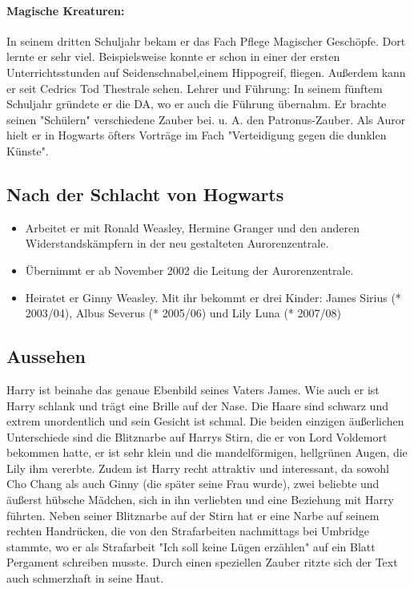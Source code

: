 \documentclass[a4paper, 10pt]{article}
\begin{document}
\paragraph{Magische Kreaturen:}
In seinem dritten Schuljahr bekam er das Fach Pflege Magischer Geschöpfe. Dort lernte er sehr viel. Beispielsweise konnte er schon in einer der ersten Unterrichtsstunden auf Seidenschnabel,einem Hippogreif, fliegen. Außerdem kann er seit Cedrics Tod Thestrale sehen.
Lehrer und Führung: In seinem fünftem Schuljahr gründete er die DA, wo er auch die Führung übernahm. Er brachte seinen "Schülern" verschiedene Zauber bei. u. A. den Patronus-Zauber. Als Auror hielt er in Hogwarts öfters Vorträge im Fach "Verteidigung gegen die dunklen Künste".
\subsection*{Nach der Schlacht von Hogwarts}
\begin{itemize}
\item Arbeitet er mit Ronald Weasley, Hermine Granger und den anderen Widerstandskämpfern in der neu gestalteten Aurorenzentrale.
\item Übernimmt er ab November 2002 die Leitung der Aurorenzentrale.
\item Heiratet er Ginny Weasley. Mit ihr bekommt er drei Kinder: James Sirius (* 2003/04), Albus Severus (* 2005/06) und Lily Luna (* 2007/08)
\end{itemize}
\subsection*{\Large Aussehen}
Harry ist beinahe das genaue Ebenbild seines Vaters James. Wie auch er ist Harry schlank und trägt eine Brille auf der Nase. Die Haare sind schwarz und extrem unordentlich und sein Gesicht ist schmal. Die beiden einzigen äußerlichen Unterschiede sind die Blitznarbe auf Harrys Stirn, die er von Lord Voldemort bekommen hatte, er ist sehr klein und die mandelförmigen, hellgrünen Augen, die Lily ihm vererbte. Zudem ist Harry recht attraktiv und interessant, da sowohl Cho Chang als auch Ginny (die später seine Frau wurde), zwei beliebte und äußerst hübsche Mädchen, sich in ihn verliebten und eine Beziehung mit Harry führten. Neben seiner Blitznarbe auf der Stirn hat er eine Narbe auf seinem rechten Handrücken, die von den Strafarbeiten nachmittags bei Umbridge stammte, wo er als Strafarbeit "Ich soll keine Lügen erzählen" auf ein Blatt Pergament schreiben musste. Durch einen speziellen Zauber ritzte sich der Text auch schmerzhaft in seine Haut.
\end{document}
